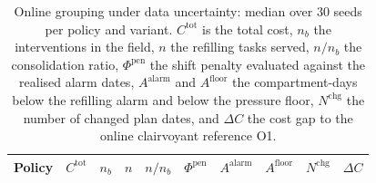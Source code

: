 \begin{table}[htbp]
\centering
\caption{Online grouping under data uncertainty: median over 30 seeds
per policy and variant. $C^{\mathrm{tot}}$ is the total cost, $n_b$ the
interventions in the field, $n$ the refilling tasks served, $n/n_b$ the
consolidation ratio, $\Phi^{\mathrm{pen}}$ the shift penalty evaluated
against the realised alarm dates, $A^{\mathrm{alarm}}$ and
$A^{\mathrm{floor}}$ the compartment-days below the refilling alarm and
below the pressure floor, $N^{\mathrm{chg}}$ the number of changed plan
dates, and $\Delta C$ the cost gap to the online clairvoyant reference O1.}
\label{tab:ch6-results}
\footnotesize
\begin{tabular}{@{}l rrrrrrrrr@{}}
\toprule
Policy & $C^{\mathrm{tot}}$ & $n_b$ & $n$ & $n/n_b$ & $\Phi^{\mathrm{pen}}$ & $A^{\mathrm{alarm}}$ & $A^{\mathrm{floor}}$ & $N^{\mathrm{chg}}$ & $\Delta C$ \\
\midrule


\end{tabular}
\end{table}
